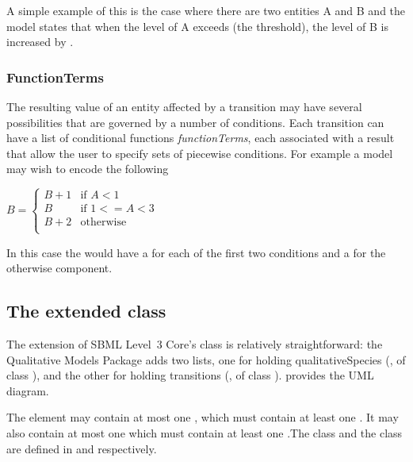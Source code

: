 A simple example of this is the case where there are two entities A and B and the model states that when the level of A exceeds  (the threshold), the level of B is increased by . 
\smallskip
\subsubsection{FunctionTerms}

The resulting value of an entity affected by a transition may have several possibilities that are governed by a number of conditions. Each transition can have a list of conditional functions \emph{functionTerms}, each associated with a result that allow the user to specify sets of piecewise conditions. For example a model may wish to encode the following
\smallskip
\begin{center}
$B = \left\{ \begin{array}{ll}
      B+1 & \mbox{if $A < 1$} \\
      B & \mbox{if $1 <= A < 3$} \\
     B + 2 & \mbox{otherwise}  \\
     \end{array}
\right.
$
\end{center}

\smallskip
In this case the \Transition would have a \FunctionTerm for each of the first two conditions and a \DefaultTerm for the otherwise component.





\subsection{The extended  class}
\label{model-class}

The extension of SBML Level~3 Core's \Model class is relatively
straightforward: the Qualitative Models Package adds two lists,
one for holding qualitativeSpecies (, of class
\ListOfQualitativeSpecies), and the other for holding transitions (,
of class \ListOfTransitions).   provides the UML
diagram.  

The  element may contain at most one \ListOfQualitativeSpecies, which must contain at least one \QualitativeSpecies. It may also contain at most one \ListOfTransitions which must contain at least one \Transition.The \QualitativeSpecies class and
the \Transition  class are defined in  and  respectively.

